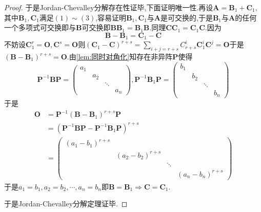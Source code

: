 {\begin{proof}
        于是Jordan-Chevalley分解存在性证毕,下面证明唯一性.再设$\bm{A}=\bm{B}_1+\bm{C}_1,$其中$\bm{B}_1,\bm{C}_1$满足$(1)\sim (3)$,容易证明$\bm{B}_1,\bm{C}_1$与$\bm{A}$是可交换的,于是$\bm{B}_1$与$\bm{A}$的任何一个多项式可交换即与$\bm{B}$可交换即$\bm{BB}_1=\bm{B}_1\bm{B}$.同理$\bm{CC}_1=\bm{C}_1\bm{C}$.因为\[
            \bm{B}-\bm{B}_1=\bm{C}_1-\bm{C}
        \]不妨设$\bm{C}_1^r=\bm{O},\bm{C}^s=\bm{O}$则$\displaystyle \left(\bm{C}_1-\bm{C}\right)^{r+s}=\sum_{i+j=r+s}C_{r+s}^i\bm{C}_1^i\bm{C}^j=\bm{O}$于是$\left(
            \bm{B}-\bm{B}_1
            \right)^{r+s}=\bm{O}$.由\cref{lem:同时对角化}知存在非异阵$\bm{P}$使得\[
            \bm{P}^{-1}\bm{BP}=\begin{pmatrix}
                a_1 &     &        &     \\
                    & a_2 &        &     \\
                    &     & \ddots &     \\
                    &     &        & a_n
            \end{pmatrix},\bm{P}^{-1}\bm{B}_1\bm{P}=\begin{pmatrix}
                b_1 &     &        &     \\
                    & b_2 &        &     \\
                    &     & \ddots &     \\
                    &     &        & b_n
            \end{pmatrix}
        \]于是\begin{align*}
            \bm{O} & =\bm{P}^{-1}\left(\bm{B}-\bm{B}_1\right)^{r+s}\bm{P}                                           \\
                   & =\left(
            \bm{P}^{-1}\bm{B}\bm{P}-\bm{P}^{-1}\bm{B}_1\bm{P}
            \right)^{r+s}                                                                                           \\
                   & =\begin{pmatrix}
                          \left(a_1-b_1\right)^{r+s} &                            &        &                            \\
                                                     & \left(a_2-b_2\right)^{r+s} &        &                            \\
                                                     &                            & \ddots &                            \\
                                                     &                            &        & \left(a_n-b_n\right)^{r+s}
                      \end{pmatrix}
        \end{align*}于是$a_1=b_1,a_2=b_2,\cdots,a_n=b_n$即$\bm{B}=\bm{B}_1\Longrightarrow \bm{C}=\bm{C}_1$.

        于是Jordan-Chevalley分解定理证毕.
    \end{proof}
}
